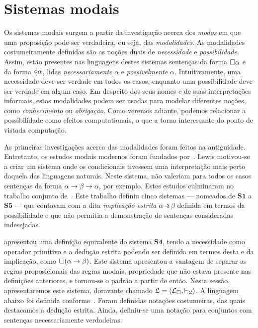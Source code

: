 \section{Sistemas modais}
    Os sistemas modais surgem a partir da investigação acerca dos \emph{modos} em que uma proposição pode ser verdadeira, ou seja, das \emph{modalidades}.
    As modalidades costumeiramente definidas são as noções duais de \emph{necessidade} e \emph{possibilidade}.
    Assim, estão presentes nas linguagens destes sistemas sentenças da forma $\Box\alpha$ e da forma $\pos\alpha$, lidas \emph{necessariamente} $\alpha$ e \emph{possivelmente} $\alpha$.
    Intuitivamente, uma necessidade deve ser verdade em todos os casos, enquanto uma possibilidade deve ser verdade em algum caso.
    Em despeito dos seus nomes e de suas interpretações informais, estas modalidades podem ser usadas para modelar diferentes noções, como \emph{conhecimento} ou \emph{obrigação}.
    Como veremos adiante, podemos relacionar a possibilidade como efeitos computationais, o que a torna interessante do ponto de vistada computação.

    \vspace{.3\baselineskip}
    As primeiras investigações acerca das modalidades foram feitos na antiguidade.
    Entretanto, os estudos modais modernos foram fundados por~\cite{Lewis}.
    Lewis motivou-se a criar um sistema onde os condicionais tivessem uma interpretação mais perto daquela das linguagens naturais.
    Neste sistema, não valeriam para todos os casos sentenças da forma $\alpha\to\beta\to\alpha$, por exemplo.
    Estes estudos culminaram no trabalho conjunto de~\cite{Langford}.
    Este trabalho definiu cinco sistemas --- nomeados de $\mathbf{S1}$ a $\mathbf{S5}$ --- que contavam com a dita \emph{implicação estrita} $\alpha\strictif\beta$ definida em termos da possibilidade e que não permitia a demonstração de sentenças consideradas indesejadas.

    \vspace{.3\baselineskip}
    \cite{Goedel} apresentou uma definição equivalente do sistema $\mathbf{S4}$, tendo a necessidade como operador primitivo e a dedução estrita podendo ser definida em termos desta e da implicação, como $\Box(\alpha\to\beta)$.
    Este sistema apresentou a vantagem de separar as regras proposicionais das regras modais, propriedade que não estava presente nas definições anteriores, e tornou-se o padrão a partir de então.
    Nesta sessão, apresentaremos este sistema, doravante chamado $\mathfrak{L}=\langle\mathcal{L}_\Box,\vdash_\mathfrak{L}\rangle$.
    A linguagem abaixo foi definida conforme~\cite{Troelstra}.
    Foram definidas notações costumeiras, das quais destacamos a dedução estrita.
    Ainda, definiu-se uma notação para conjuntos com sentenças necessariamente verdadeiras.


